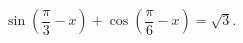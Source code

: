 \begin{ex}[type=equation]
	\begin{condition}
		$\ \sin{\left( \dfrac{\pi}{3}-x\right)} + \cos{\left( \dfrac{\pi}{6}-x\right)}=\sqrt{3}. $
	\end{condition}
\end{ex}